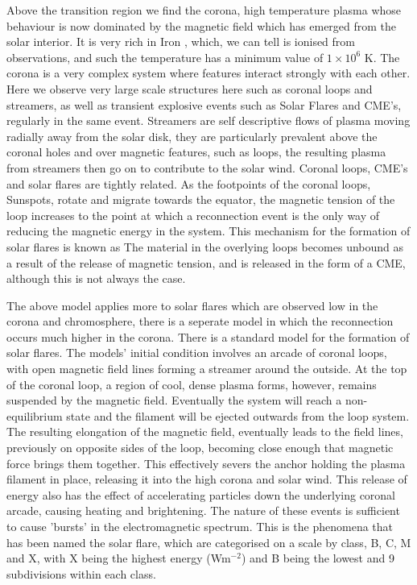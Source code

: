 Above the transition region we find the corona, high temperature plasma whose behaviour is now dominated by the magnetic field which has emerged from the solar interior.
It is very rich in Iron , which, we can tell is ionised from observations, and such the temperature has a minimum value of $1 \times 10^6$ K.
The corona is a very complex system where features interact strongly with each other.
Here we observe very large scale structures here such as coronal loops and streamers, as well as transient explosive events such as Solar Flares and CME's, regularly in the same event.
Streamers are self descriptive flows of plasma moving radially away from the solar disk, they are particularly prevalent above the coronal holes and over magnetic features, such as loops, the resulting plasma from streamers then go on to contribute to the solar wind.
Coronal loops, CME's and solar flares are tightly related.
As the footpoints of the coronal loops, Sunspots, rotate and migrate towards the equator, the magnetic tension of the loop increases to the point at which a reconnection event is the only way of reducing the magnetic energy in the system.
This mechanism for the formation of solar flares is known as 
The material in the overlying loops becomes unbound as a result of the release of magnetic tension, and is released in the form of a CME, although this is not always the case.

The above model applies more to solar flares which are observed low in the corona and chromosphere, there is a seperate model in which the reconnection occurs much higher in the corona.
There is a standard model for the formation of solar flares.
The models' initial condition involves an arcade of coronal loops, with open magnetic field lines forming a streamer around the outside.
At the top of the coronal loop, a region of cool, dense plasma forms, however, remains suspended by the magnetic field.
Eventually the system will reach a non-equilibrium state and the filament will be ejected outwards from the loop system.
The resulting elongation of the magnetic field, eventually leads to the field lines, previously on opposite sides of the loop, becoming close enough that magnetic force brings them together.
This effectively severs the anchor holding the plasma filament in place, releasing it into the high corona and solar wind. 
This release of energy also has the effect of accelerating particles down the underlying coronal arcade, causing heating and brightening.
The nature of these events is sufficient to cause 'bursts' in the electromagnetic spectrum.
This is the phenomena that has been named the solar flare, which are categorised on a scale by class, B, C, M and X, with X being the highest energy (Wm$^{-2}$) and B being the lowest and 9 subdivisions within each class. 

